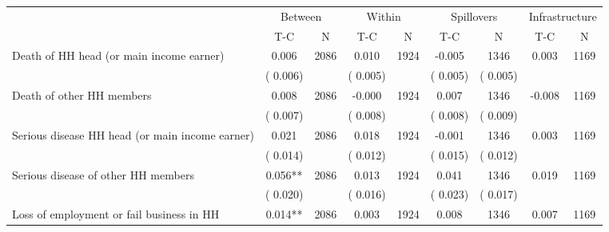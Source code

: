 
\begin{tabular}{l*{8}{c}}\hline&\multicolumn{2}{c}{Between}&\multicolumn{2}{c}{Within}&\multicolumn{2}{c}{Spillovers}&\multicolumn{2}{c}{Infrastructure}\\ \cmidrule(r){2-3}\cmidrule(l){4-5}\cmidrule(l){6-7}\cmidrule(l){8-9} & {T-C} & {N} & {T-C} & {N}  & {T-C}  & {N} & {T-C}  & {N} \\ \midrule
Death of HH head (or main income earner)        &              0.006      &       2086       &              0.010      &       1924       &             -0.005      &       1346  &        0.003 &       1169       \\
                       &       (       0.006)            &                               &       (       0.005)            &                               &       (       0.005)            &       (       0.005) &                  \\
Death of other HH members        &              0.008      &       2086       &             -0.000      &       1924       &              0.007      &       1346  &       -0.008 &       1169       \\
                       &       (       0.007)            &                               &       (       0.008)            &                               &       (       0.008)            &       (       0.009) &                  \\
Serious disease HH head (or main income earner)        &              0.021      &       2086       &              0.018      &       1924       &             -0.001      &       1346  &        0.003 &       1169       \\
                       &       (       0.014)            &                               &       (       0.012)            &                               &       (       0.015)            &       (       0.012) &                  \\
Serious disease of other HH members        &              0.056**      &       2086       &              0.013      &       1924       &              0.041      &       1346  &        0.019 &       1169       \\
                       &       (       0.020)            &                               &       (       0.016)            &                               &       (       0.023)            &       (       0.017) &                  \\
Loss of employment or fail business in HH        &              0.014**      &       2086       &              0.003      &       1924       &              0.008      &       1346  &        0.007 &       1169       \\

\end{tabular}
